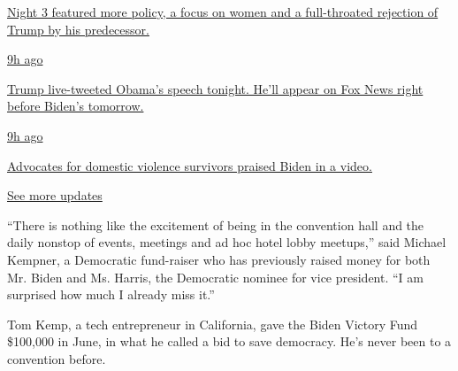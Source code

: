 \href{https://www.nytimes3xbfgragh.onion/live/2020/08/19/us/dnc-convention-election?action=click\&pgtype=Article\&state=default\&region=MAIN_CONTENT_1\&context=storylines_live_updates\#night-3-featured-more-policy-a-focus-on-women-and-a-full-throated-rejection-of-trump-by-his-predecessor}{Night
3 featured more policy, a focus on women and a full-throated rejection
of Trump by his predecessor.}

\href{https://www.nytimes3xbfgragh.onion/live/2020/08/19/us/dnc-convention-election?action=click\&pgtype=Article\&state=default\&region=MAIN_CONTENT_1\&context=storylines_live_updates\#trump-live-tweeted-obamas-speech-tonight-hell-appear-on-fox-news-right-before-bidens-tomorrow}{9h
ago}

\href{https://www.nytimes3xbfgragh.onion/live/2020/08/19/us/dnc-convention-election?action=click\&pgtype=Article\&state=default\&region=MAIN_CONTENT_1\&context=storylines_live_updates\#trump-live-tweeted-obamas-speech-tonight-hell-appear-on-fox-news-right-before-bidens-tomorrow}{Trump
live-tweeted Obama's speech tonight. He'll appear on Fox News right
before Biden's tomorrow.}

\href{https://www.nytimes3xbfgragh.onion/live/2020/08/19/us/dnc-convention-election?action=click\&pgtype=Article\&state=default\&region=MAIN_CONTENT_1\&context=storylines_live_updates\#advocates-for-domestic-violence-survivors-praised-biden-in-a-video}{9h
ago}

\href{https://www.nytimes3xbfgragh.onion/live/2020/08/19/us/dnc-convention-election?action=click\&pgtype=Article\&state=default\&region=MAIN_CONTENT_1\&context=storylines_live_updates\#advocates-for-domestic-violence-survivors-praised-biden-in-a-video}{Advocates
for domestic violence survivors praised Biden in a video.}

\href{https://www.nytimes3xbfgragh.onion/live/2020/08/19/us/dnc-convention-election?action=click\&pgtype=Article\&state=default\&region=MAIN_CONTENT_1\&context=storylines_live_updates}{See
more updates}

``There is nothing like the excitement of being in the convention hall
and the daily nonstop of events, meetings and ad hoc hotel lobby
meetups,'' said Michael Kempner, a Democratic fund-raiser who has
previously raised money for both Mr. Biden and Ms. Harris, the
Democratic nominee for vice president. ``I am surprised how much I
already miss it.''

Tom Kemp, a tech entrepreneur in California, gave the Biden Victory Fund
\$100,000 in June, in what he called a bid to save democracy. He's never
been to a convention before.

